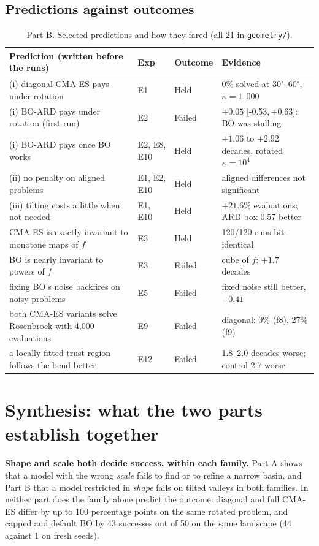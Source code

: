 \documentclass[10pt,a4paper]{article}
\newcommand{\ci}[2]{[#1,\,#2]}
\begin{document}
\subsection{Predictions against outcomes}
\begin{table}[h]
\centering\footnotesize
\begin{tabular}{p{6.0cm}lp{1.9cm}p{6.0cm}}
\toprule
Prediction (written before the runs) & Exp & Outcome & Evidence \\
\midrule
(i) diagonal CMA-ES pays under rotation & E1 & Held & 0\% solved at $30^\circ$--$60^\circ$, $\kappa=1{,}000$ \\
(i) BO-ARD pays under rotation (first run) & E2 & Failed & $+0.05$ \ci{-0.53}{+0.63}: BO was stalling \\
(i) BO-ARD pays once BO works & E2, E8, E10 & Held & $+1.06$ to $+2.92$ decades, rotated $\kappa=10^4$ \\
(ii) no penalty on aligned problems & E1, E2, E10 & Held & aligned differences not significant \\
(iii) tilting costs a little when not needed & E1, E10 & Held & $+21.6\%$ evaluations; ARD box 0.57 better \\
CMA-ES is exactly invariant to monotone maps of $f$ & E3 & Held & 120/120 runs bit-identical \\
BO is nearly invariant to powers of $f$ & E3 & Failed & cube of $f$: $+1.7$ decades \\
fixing BO's noise backfires on noisy problems & E5 & Failed & fixed noise still better, $-0.41$ \\
both CMA-ES variants solve Rosenbrock with 4,000 evaluations & E9 & Failed & diagonal: 0\% (f8), 27\% (f9) \\
a locally fitted trust region follows the bend better & E12 & Failed & 1.8--2.0 decades worse; control 2.7 worse \\
\bottomrule
\end{tabular}
\caption{Part B. Selected predictions and how they fared (all 21 in \texttt{geometry/}).}
\end{table}

\section{Synthesis: what the two parts establish together}\label{sec:synth}
\textbf{Shape and scale both decide success, within each family.} Part A shows that a model with the wrong
\emph{scale} fails to find or to refine a narrow basin, and Part B that a model restricted in \emph{shape} fails on
tilted valleys in both families. In neither part does the family alone predict the outcome: diagonal and full
CMA-ES differ by up to 100 percentage points on the same rotated problem, and capped and default BO by 43 successes out of 50
on the same landscape (44 against 1 on fresh seeds).
\end{document}
